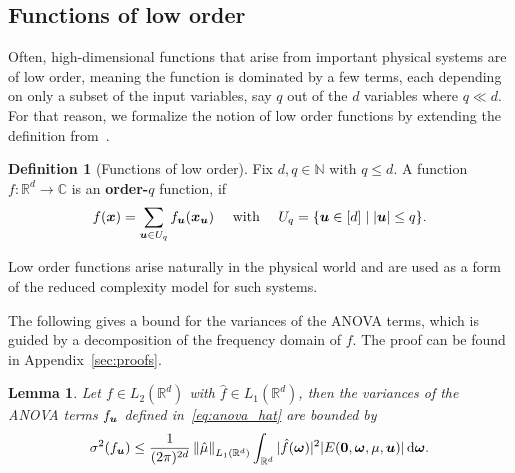 \documentclass{article}
\renewcommand{\vec}[1]{\ensuremath \mathbf{\boldsymbol{#1}}}
\newcommand{\w}{\ensuremath{\vec \omega}}
\newcommand{\x}{\ensuremath{\vec x}}
\newcommand{\N}{\ensuremath{\mathbb{N}}}
\newcommand{\R}{\ensuremath{\mathbb{R}}}
\newcommand{\C}{\ensuremath{\mathbb{C}}}
\renewcommand{\d}{\, \mathrm{d}}
\newcommand{\norm}[1]{\left\lVert {#1} \right\rVert}    %
\newtheorem{lemma}[theorem]{Lemma}
\theoremstyle{definition}
\newtheorem{definition}[theorem]{Definition}
\newenvironment{Lemma}{ \begin{lemma}\normalfont\slshape}{\end{lemma}}
\numberwithin{equation}{section}
\begin{document}
\subsection{Functions of low order}
Often, high-dimensional functions that arise from important physical systems are of low
order, meaning the function is dominated by a few terms, each depending on only a
subset of the input variables, say $q$ out of the $d$ variables where $q \ll d$. For that reason, we 
formalize the notion of low order functions by extending the definition
from~\cite{Ha23}.
\begin{definition}[Functions of low order]
Fix $d,q\in \N$ with $q\leq d$. A function $f\colon \R^d \rightarrow \C$ is an \textbf{order-$q$} function, if  
$$f(\x) =  \sum_{\vec u \in U_q } f_{\vec u}(\x_{\vec u}) \quad \text{ with } \quad U_q = \{\vec u\in [d] \mid |\vec u|\leq q\} .$$
\end{definition}
Low order functions arise naturally in the physical world and are used as a form of the reduced complexity
model for such systems. \par 
The following gives a bound for the variances of the ANOVA terms, which is guided by a decomposition of the frequency domain of $f$. The proof can be found in Appendix~\ref{sec:proofs}.
\begin{Lemma}\label{lem:sigma_bound}
Let $f\in L_2(\R^d)$ with $\hat f \in L_1(\R^d)$, then the variances of the ANOVA terms $f_{\vec u}$ defined in~\eqref{eq:anova_hat} are bounded by
$$\sigma^2(f_{\vec u}) \leq \frac{1}{(2\pi)^{2d}} \norm{\hat{\mu}}_{L_1(\R^d)}\int_{\R^d}|  \hat f(\w)|^2
| E(\vec 0,\w,\mu,\vec u)| \d \w. $$
\end{Lemma}
\end{document}

